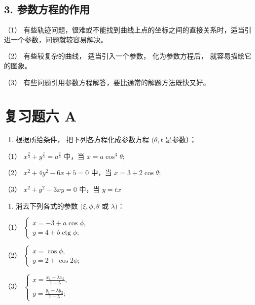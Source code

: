 \subsection{3.
参数方程的作用}\label{ux53c2ux6570ux65b9ux7a0bux7684ux4f5cux7528}

（1）
有些轨迹问题，很难或不能找到曲线上点的坐标之间的直接关系时，适当引进一个参数，问题就较容易解决。

（2） 有些较复杂的曲线， 适当引入一个参数， 化为参数方程后，
就容易描绘它的图象。

（3） 有些问题引用参数方程解答，要比通常的解题方法既快又好。

\section{复习题六 A}\label{ux590dux4e60ux9898ux516d-a}

\begin{enumerate}
\def\labelenumi{\arabic{enumi}.}
\tightlist
\item
  根据所给条件， 把下列各方程化成参数方程 \((\theta, t\) 是参数）；
\end{enumerate}

（1） \(x^{\frac{2}{3}} + y^{\frac{2}{3}} = a^{\frac{2}{3}}\) 中，当
\(x = a\cos^3\theta ;\)

（2） \(x^{2} + 4y^{2} - 6x + 5 = 0\) 中，当 \(x = 3 + 2\cos \theta ;\)

（3） \(x^{2} + y^{2} - 3xy = 0\) 中，当 \(y = tx\)

\begin{enumerate}
\def\labelenumi{\arabic{enumi}.}
\setcounter{enumi}{1}
\tightlist
\item
  消去下列各式的参数 \((\xi, \phi, \theta\) 或 \(\lambda)\)：
\end{enumerate}

（1）
\(\left\{ \begin{array}{l} x = -3 + a \cos \phi, \\ y = 4 + b \operatorname{ctg} \phi; \end{array} \right.\)

（2）
\(\left\{ \begin{array}{l} x = \cos \phi, \\ y = 2 + \cos 2\phi; \end{array} \right.\)

（3）
\(\left\{ \begin{array}{l} x = \frac{x_1 + \lambda x_2}{1 + \lambda}, \\ y = \frac{y_1 + \lambda y_2}{1 + \lambda}; \end{array} \right.\)

